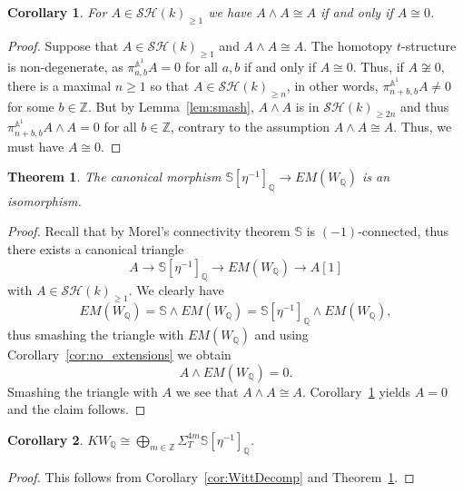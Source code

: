 \documentclass[a4paper,12pt,draft]{amsart}
\newtheorem{theorem}{Theorem}
\newtheorem{corollary}{Corollary}
\theoremstyle{definition}
\theoremstyle{remark}
\begin{document}
\begin{corollary}\label{cor:smash_tstructure}
For $A\in {\mathcal{SH}}(k)_{\ge 1}$ we have $A\wedge A \cong A$ if and only if $A\cong 0$.
\end{corollary}
\begin{proof} Suppose that $A\in {\mathcal{SH}}(k)_{\ge 1}$ and  $A\wedge A \cong A$. The homotopy $t$-structure is non-degenerate, as $\pi^{{{\mathbb A}}^1}_{a,b}A=0$ for all $a,b$ if and only if $A\cong 0$. Thus, if $A\not\cong0$, there is a maximal $n\ge 1$ so that $A\in {\mathcal{SH}}(k)_{\ge n}$, in other words, $\pi^{{{\mathbb A}}^1}_{n+b,b}A\neq 0$ for some $b\in {{\mathbb Z}}$. But  by Lemma~\ref{lem:smash},  $A\wedge A$ is in ${\mathcal{SH}}(k)_{\ge 2n}$ and thus  $\pi^{{{\mathbb A}}^1}_{n+b,b}A\wedge A=0$ for all $b\in {{\mathbb Z}}$, contrary to the assumption $A\wedge A\cong A$. Thus, we must have $A\cong 0$.
\end{proof}

\begin{theorem}\label{thm:Main}
The canonical morphism $\mathbb{S}[\eta^{-1}]_{{\mathbb Q}}\to EM(W_{{\mathbb Q}})$ is an isomorphism.
\end{theorem}
\begin{proof}
Recall that by Morel's connectivity theorem $\mathbb{S}$ is $(-1)$-connected, thus there exists a canonical triangle
\[
A\to \mathbb{S}[\eta^{-1}]_{{\mathbb Q}}\to EM(W_{{\mathbb Q}}) \to A[1]
\]
with $A\in {\mathcal{SH}}(k)_{\ge 1}$. We clearly have
\[
EM(W_{{\mathbb Q}}) =\mathbb{S}\wedge EM(W_{{\mathbb Q}})=\mathbb{S}[\eta^{-1}]_{{\mathbb Q}}\wedge EM(W_{{\mathbb Q}}),
\]
thus smashing the triangle with $EM(W_{{\mathbb Q}})$ and using Corollary~\ref{cor:no_extensions} we obtain
\[
A\wedge EM(W_{{\mathbb Q}})=0.
\]
Smashing the triangle with $A$ we see that $A\wedge A\cong A$. Corollary~\ref{cor:smash_tstructure} yields $A=0$ and the claim follows.
\end{proof}

\begin{corollary} 
$KW_{{\mathbb Q}} \cong \bigoplus_{m\in {{\mathbb Z}}} \Sigma_T^{4m} \mathbb{S}[\eta^{-1}]_{{\mathbb Q}}$.
\end{corollary}

\begin{proof} This follows from Corollary~\ref{cor:WittDecomp} and Theorem~\ref{thm:Main}.
\end{proof}
\end{document}
